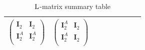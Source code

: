 \documentclass[12pt]{article}
\def\rL{{\rm L}}
\let\bm\relax
\newcommand{\bm}[1]{{\boldsymbol{#1}}}
\begin{document}
\begin{table}[H]
\begin{center}
\begin{tabular}{|m{4.5em}|m{4cm}|m{4cm}|m{4cm}|m{4cm}|m{4cm}|m{1cm}|m{1cm}|m{1cm}|}
$\begin{pmatrix}
\mathbf{I}_2&\mathbf{I}_2 \\
\mathbf{I}^A_2&\mathbf{I}^A_2 \\
\end{pmatrix}$&
$\begin{pmatrix}
\mathbf{I}^A_2 & \mathbf{I}_2 \\
\mathbf{I}^A_2 & \mathbf{I}_2 \\
\end{pmatrix}$
\\
\hline
\end{tabular}
\end{center}
\caption{$\bm\rL$-matrix summary table}
\end{table}
\end{document}
